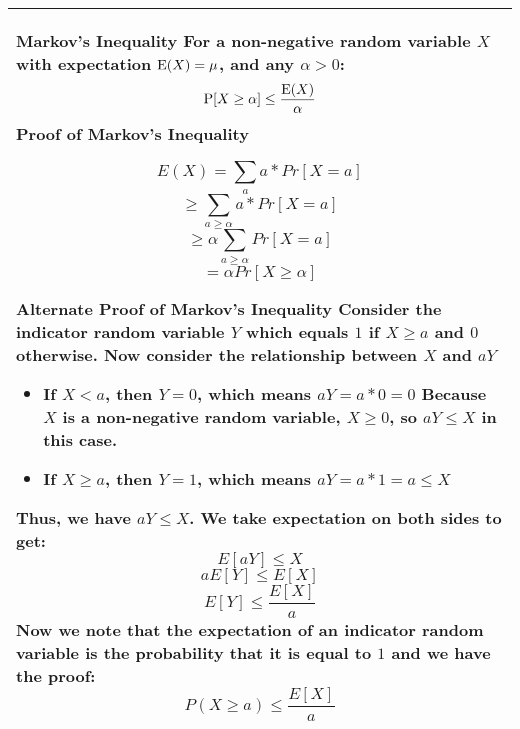 {\tabulinesep=1mm
\begin{tabu}{|p{16cm} |}
\hline
\vspace{2 mm}
\textbf{Markov's Inequality } \newline
For a non-negative random variable $X$ with expectation $\text{E}(X) = \mu$, 
and any  $\alpha > 0$:
\[\text{P}[X \geq \alpha] \leq \frac{\text{E}(X)}{\alpha}\]
\vspace{2 mm}
\textbf{Proof of Markov's Inequality}\newline

\[E(X) = \sum_a a * Pr[X = a] \]
\[\geq \sum_{a \geq \alpha} a *  Pr[X = a] \]
\[\geq \alpha \sum_{a \geq \alpha} Pr[X = a] \]
\[= \alpha Pr[X \geq \alpha]\]

\textbf{Alternate Proof of Markov's Inequality} \newline
Consider the indicator random variable $Y$ which equals $1$ if $X \geq a$ and $0$ otherwise. \newline
Now consider the relationship between $X$ and $aY$ \newline
\begin{itemize}
	\item If $X < a$, then $Y = 0$, which means $aY = a * 0 = 0$ \newline
	Because $X$ is a non-negative random variable, $X \geq 0$, so $aY \leq X$ in this case. 
	\item If $X \geq a$, then $Y = 1$, which means $aY = a * 1 = a \leq X$ \newline
\end{itemize}
Thus, we have $aY \leq X$. \newline
We take expectation on both sides to get: 
\[E[aY] \leq X\]
\[aE[Y] \leq E[X]\]
\[E[Y] \leq \frac{E[X]}{a} \]
Now we note that the expectation of an indicator random variable is the probability that it is equal to $1$ and we have the proof:
\[P(X \geq a) \leq \frac{E[X]}{a} \]
\vspace{2 mm}
\\
\hline
\end{tabu}
}

